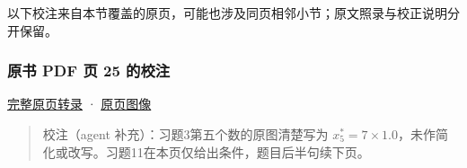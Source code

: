 \documentclass[
  10pt,
  fontset=fandol]{ctexart}
\begin{document}
以下校注来自本节覆盖的原页，可能也涉及同页相邻小节；原文照录与校正说明分开保留。

\subsubsection{原书 PDF 页 25 的校注}\label{ux539fux4e66-pdf-ux9875-25-ux7684ux6821ux6ce8}

\href{../pages/pdf-025.md}{完整原页转录} · \href{../../source-images/pdf-025.jpeg}{原页图像}

\begin{quote}
校注（agent 补充）：习题3第五个数的原图清楚写为 \(x_5^*=7\times1.0\)，未作简化或改写。习题11在本页仅给出条件，题目后半句续下页。
\end{quote}
\end{document}
